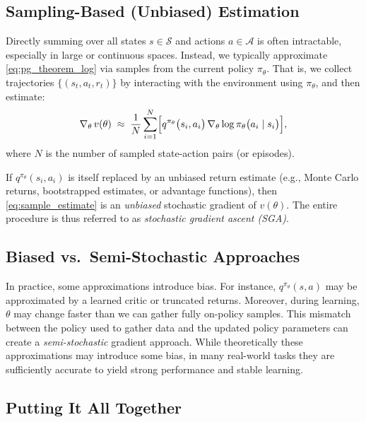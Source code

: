 \subsection{Sampling-Based (Unbiased) Estimation}
\label{sec:sampling_estimation}

Directly summing over all states $s \in \mathcal{S}$ and actions $a \in \mathcal{A}$ is often intractable, especially in large or continuous spaces. Instead, we typically approximate \eqref{eq:pg_theorem_log} via samples from the current policy $\pi_\theta$. That is, we collect trajectories $\{(s_t, a_t, r_t)\}$ by interacting with the environment using $\pi_\theta$, and then estimate:
\begin{equation}
  \nabla_\theta \,v(\theta) 
  \;\approx\; 
  \frac{1}{N} \sum_{i=1}^{N} \Bigl[
     q^{\pi_\theta}\bigl(s_i, a_i\bigr)
     \,\nabla_\theta \log \pi_\theta\bigl(a_i \mid s_i\bigr)
  \Bigr],
  \label{eq:sample_estimate}
\end{equation}
where $N$ is the number of sampled state-action pairs (or episodes). 

If $q^{\pi_\theta}(s_i, a_i)$ is itself replaced by an unbiased return estimate (e.g., Monte Carlo returns, bootstrapped estimates, or advantage functions), then \eqref{eq:sample_estimate} is an \emph{unbiased} stochastic gradient of $v(\theta)$. The entire procedure is thus referred to as \emph{stochastic gradient ascent (SGA)}. 

\subsection{Biased vs.\ Semi-Stochastic Approaches}
\label{sec:biased_approx}

In practice, some approximations introduce bias. For instance, $q^{\pi_\theta}(s,a)$ may be approximated by a learned critic or truncated returns. Moreover, during learning, $\theta$ may change faster than we can gather fully on-policy samples. This mismatch between the policy used to gather data and the updated policy parameters can create a \emph{semi-stochastic} gradient approach. While theoretically these approximations may introduce some bias, in many real-world tasks they are sufficiently accurate to yield strong performance and stable learning.

\subsection{Putting It All Together}
\label{sec:ga_conclusion}

